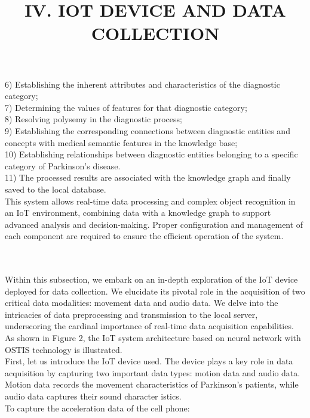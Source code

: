 \documentclass[a4paper,10pt,twocolumn]{article}
\begin{document}
\begin{flushleft}
6) Establishing the inherent attributes and characteristics of the diagnostic category;\\
7) Determining the values of features for that diagnostic category;\\
8) Resolving polysemy in the diagnostic process;\\
9) Establishing the corresponding connections between
diagnostic entities and concepts with medical semantic features in the knowledge base;\\
10) Establishing relationships between diagnostic entities belonging to a specific category of Parkinson’s
disease.\\
11) The processed results are associated with the knowledge graph and finally saved to the local database.\\
\hspace{1cm}This system allows real-time data processing and complex object recognition in an IoT environment, combining data with a knowledge graph to support advanced
analysis and decision-making. Proper configuration and
management of each component are required to ensure
the efficient operation of the system.\\
\hspace{5cm}
\\ \hspace{0.7cm}\title{IV. IOT DEVICE AND DATA COLLECTION}\\
\hspace{8cm}
\hspace{1cm}Within this subsection, we embark on an in-depth
exploration of the IoT device deployed for data collection.
We elucidate its pivotal role in the acquisition of two
critical data modalities: movement data and audio data.
We delve into the intricacies of data preprocessing and
transmission to the local server, underscoring the cardinal
importance of real-time data acquisition capabilities. As
shown in Figure 2, the IoT system architecture based on
neural network with OSTIS technology is illustrated.\\
\hspace{1cm}First, let us introduce the IoT device used. The device
plays a key role in data acquisition by capturing two
important data types: motion data and audio data. Motion
data records the movement characteristics of Parkinson’s
patients, while audio data captures their sound character istics.\\
\hspace{1cm}To capture the acceleration data of the cell phone:\\

\end{flushleft}
\end{document}
